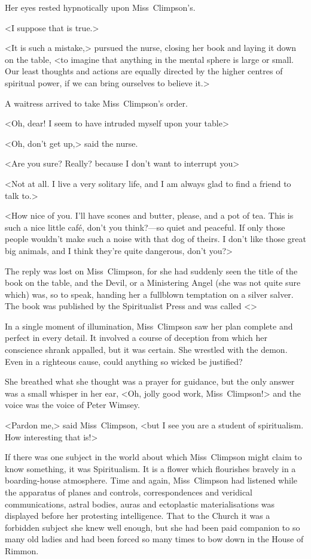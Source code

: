Her eyes rested hypnotically upon Miss~Climpson's.

<I suppose that is true.>

<It is such a mistake,> pursued the nurse, closing her book and laying it down on the table, <to imagine that anything in the mental sphere is large or small. Our least thoughts and actions are equally directed by the higher centres of spiritual power, if we can bring ourselves to believe it.>

A waitress arrived to take Miss~Climpson's order.

<Oh, dear! I seem to have intruded myself upon your table\longdots>

<Oh, don't get up,> said the nurse.

<Are you sure? Really? because I don't want to interrupt you\longdash>

<Not at all. I live a very solitary life, and I am always glad to find a friend to talk to.>

<How nice of you. I'll have scones and butter, please, and a pot of tea. This is such a nice little café, don't you think?—so quiet and peaceful. If only those people wouldn't make such a noise with that dog of theirs. I don't like those great big animals, and I think they're quite dangerous, don't you?>

The reply was lost on Miss~Climpson, for she had suddenly seen the title of the book on the table, and the Devil, or a Ministering Angel (she was not quite sure which) was, so to speak, handing her a fullblown temptation on a silver salver. The book was published by the Spiritualist Press and was called <>

In a single moment of illumination, Miss~Climpson saw her plan complete and perfect in every detail. It involved a course of deception from which her conscience shrank appalled, but it was certain. She wrestled with the demon. Even in a righteous cause, could anything so wicked be justified?

She breathed what she thought was a prayer for guidance, but the only answer was a small whisper in her ear, <Oh, jolly good work, Miss~Climpson!> and the voice was the voice of Peter Wimsey.

<Pardon me,> said Miss~Climpson, <but I see you are a student of spiritualism. How interesting that is!>

If there was one subject in the world about which Miss~Climpson might claim to know something, it was Spiritualism. It is a flower which flourishes bravely in a boarding-house atmosphere. Time and again, Miss~Climpson had listened while the apparatus of planes and controls, correspondences and veridical communications, astral bodies, auras and ectoplastic materialisations was displayed before her protesting intelligence. That to the Church it was a forbidden subject she knew well enough, but she had been paid companion to so many old ladies and had been forced so many times to bow down in the House of Rimmon.

